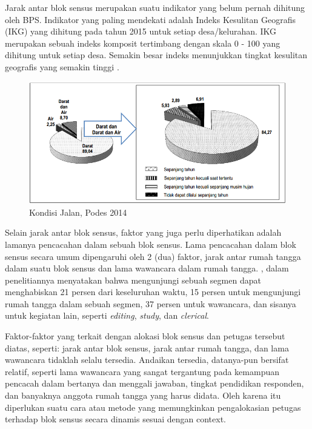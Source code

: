 Jarak antar blok sensus merupakan suatu indikator yang belum pernah dihitung oleh BPS. Indikator yang paling mendekati adalah Indeks Kesulitan Geografis (IKG) yang dihitung pada tahun 2015 untuk setiap desa/kelurahan. IKG merupakan sebuah indeks komposit tertimbang dengan skala 0 - 100 yang dihitung untuk setiap desa. Semakin besar indeks menunjukkan tingkat kesulitan geografis yang semakin tinggi \citep{bps_badan_2015}.


\begin{figure}[h]
    \centering
    \includegraphics[width=\textwidth]{../../Resources/Images/podes_2014_jalan}
    \caption{Kondisi Jalan, Podes 2014}
    \label{fig:capi-ilustration}
\end{figure}


Selain jarak antar blok sensus, faktor yang juga perlu diperhatikan adalah lamanya pencacahan dalam sebuah blok sensus. Lama pencacahan dalam blok sensus secara umum dipengaruhi oleh 2 (dua) faktor, jarak antar rumah tangga dalam suatu blok sensus dan lama wawancara dalam rumah tangga. \citep{sudman_time_1965}, dalam penelitiannya menyatakan bahwa mengunjungi sebuah segmen dapat menghabiskan 21 persen dari keseluruhan waktu, 15 persen untuk mengunjungi rumah tangga dalam sebuah segmen, 37 persen untuk wawancara, dan sisanya untuk kegiatan lain, seperti \textit{editing}, \textit{study}, dan \textit{clerical}.


Faktor-faktor yang terkait dengan alokasi blok sensus dan petugas tersebut diatas, seperti: jarak antar blok sensus, jarak antar rumah tangga, dan lama wawancara tidaklah selalu tersedia. Andaikan tersedia, datanya-pun bersifat relatif, seperti lama wawancara yang sangat tergantung pada kemampuan pencacah dalam bertanya dan menggali jawaban, tingkat pendidikan responden, dan banyaknya anggota rumah tangga yang harus didata. Oleh karena itu diperlukan suatu cara atau metode yang memungkinkan pengalokasian petugas terhadap blok sensus secara dinamis sesuai dengan context.


